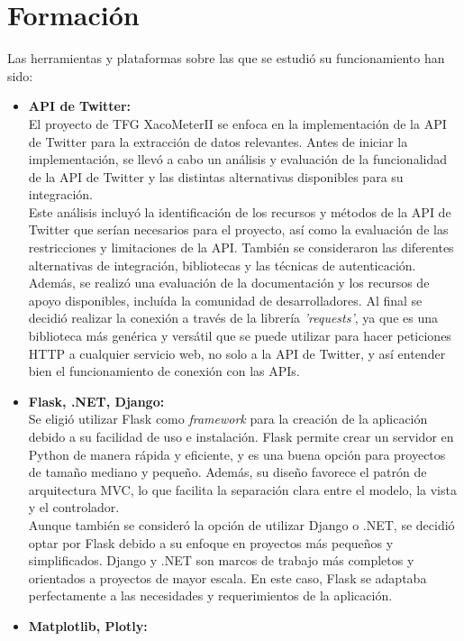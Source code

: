 \section{Formación}
Las herramientas y plataformas sobre las que se estudió su funcionamiento han sido:
\begin{itemize}
    \item \textbf{API de Twitter:} \\
    El proyecto de TFG XacoMeterII se enfoca en la implementación de la API de Twitter para la extracción de datos relevantes. Antes de iniciar la implementación, se llevó a cabo un análisis y evaluación de la funcionalidad de la API de Twitter y las distintas alternativas disponibles para su integración.\\
    Este análisis incluyó la identificación de los recursos y métodos de la API de Twitter que serían necesarios para el proyecto, así como la evaluación de las restricciones y limitaciones de la API. También se consideraron las diferentes alternativas de integración, bibliotecas y las técnicas de autenticación.\\ 
    Además, se realizó una evaluación de la documentación y los recursos de apoyo disponibles, incluída la comunidad de desarrolladores. Al final se decidió realizar la conexión a través de la librería \textit{'requests'}, ya que es una biblioteca más genérica y versátil que se puede utilizar para hacer peticiones HTTP a cualquier servicio web, no solo a la API de Twitter, y así entender bien el funcionamiento de conexión con las APIs.\\
    \item \textbf{Flask, .NET, Django:}\\
    Se eligió utilizar Flask como \textit{framework} para la creación de la aplicación debido a su facilidad de uso e instalación. Flask permite crear un servidor en Python de manera rápida y eficiente, y es una buena opción para proyectos de tamaño mediano y pequeño. Además, su diseño favorece el patrón de arquitectura MVC, lo que facilita la separación clara entre el modelo, la vista y el controlador.\\
    Aunque también se consideró la opción de utilizar Django o .NET, se decidió optar por Flask debido a su enfoque en proyectos más pequeños y simplificados. Django y .NET son marcos de trabajo más completos y orientados a proyectos de mayor escala. En este caso, Flask se adaptaba perfectamente a las necesidades y requerimientos de la aplicación.
    \item \textbf{Matplotlib, Plotly:}\\

\end{itemize}

